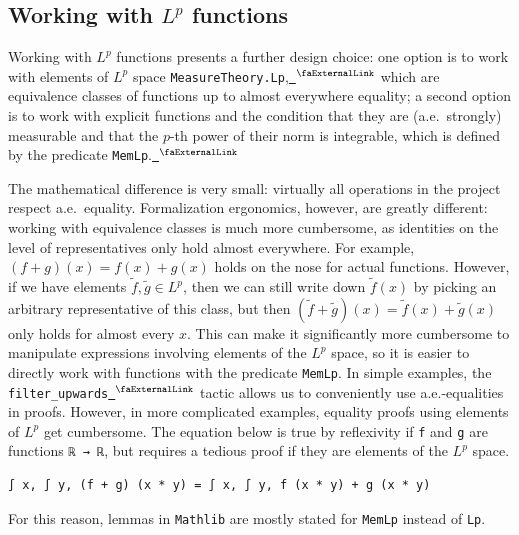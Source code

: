 \documentclass[12pt, reqno]{amsart}
\newcounter{lstlisting}[section]
\let\lean\lstinline
\newcommand{\mathlib}{\texttt{Mathlib}\xspace}
\newcommand{\extlink}{~\ensuremath{{}^\text{\faExternalLink}}}
\theoremstyle{definition}
\theoremstyle{plain}
\begin{document}
\subsection{Working with \texorpdfstring{$L^p$}{L\^{}p} functions}\label{subsec:Lp}

Working with $L^p$ functions presents a further design choice: one option is to work with elements of $L^p$ space
\lean{MeasureTheory.Lp},\href{https://github.com/leanprover-community/mathlib4/blob/b63493a4746b4651fceb3bcf3a4651cc36a4b8de/Mathlib/MeasureTheory/Function/LpSpace/Basic.lean#L88-L96}{\extlink}
which are equivalence classes of functions up to almost everywhere equality;
a second option is to work with explicit functions and the condition that they are (a.e.\ strongly) measurable and that the $p$-th power of their norm is integrable, which is defined by the predicate \lean{MemLp}.\href{https://github.com/leanprover-community/mathlib4/blob/b63493a4746b4651fceb3bcf3a4651cc36a4b8de/Mathlib/MeasureTheory/Function/LpSeminorm/Defs.lean#L116-L119}{\extlink}

The mathematical difference is very small: virtually all operations in the project respect a.e.\ equality.
Formalization ergonomics, however, are greatly different: working with equivalence classes is much more cumbersome, as identities on the level of representatives only hold almost everywhere.
For example, $(f+g)(x) = f(x) + g(x)$ holds on the nose for actual functions.
However, if we have elements $\tilde{f},\tilde{g}\in L^p$,
then we can still write down $\tilde{f}(x)$ by picking an arbitrary representative of this class, but then $(\tilde{f}+\tilde{g})(x)=\tilde{f}(x)+\tilde{g}(x)$ only holds for almost every $x$.
This can make it significantly more cumbersome to manipulate expressions involving elements of the $L^p$ space, so it is easier to directly work with functions with the predicate \lean{MemLp}.
In simple examples, the \lean{filter_upwards}\href{https://github.com/leanprover-community/mathlib4/blob/b63493a4746b4651fceb3bcf3a4651cc36a4b8de/Mathlib/Order/Filter/Defs.lean#L444}{\extlink} tactic
allows us to conveniently use a.e.-equalities in proofs.
However, in more complicated examples, equality proofs using elements of $L^p$ get cumbersome.
The equation below is true by reflexivity if \lean{f} and \lean{g} are functions \lean{ℝ → ℝ},
but requires a tedious proof if they are elements of the $L^p$ space.
\begin{lstlisting}
∫ x, ∫ y, (f + g) (x * y) = ∫ x, ∫ y, f (x * y) + g (x * y)
\end{lstlisting}
For this reason, lemmas in \mathlib are mostly stated for \lean{MemLp} instead of \lean{Lp}.
\end{document}
